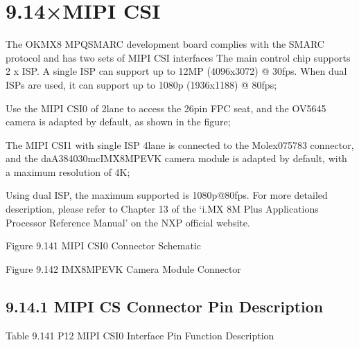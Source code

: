 \documentclass[letterpaper,10pt,openany,english]{sphinxmanual}
\begin{document}
\section{9.14×MIPI CSI}
\label{\detokenize{hardware:id29}}
\sphinxAtStartPar
The OK\sphinxhyphen{}MX8 MPQ\sphinxhyphen{}SMARC development board complies with the SMARC protocol and has two sets of MIPI CSI interfaces The main control chip supports 2 x ISP. A single ISP can support up to 12MP (4096x3072) @ 30fps. When dual ISPs are used, it can support up to 1080p (1936x1188) @ 80fps;

\sphinxAtStartPar
Use the MIPI CSI0 of 2\sphinxhyphen{}lane to access the 26pin FPC seat, and the OV5645 camera is adapted by default, as shown in the figure;

\sphinxAtStartPar
The MIPI CSI1 with single ISP 4\sphinxhyphen{}lane is connected to the Molex075783 connector, and the daA3840\sphinxhyphen{}30mc\sphinxhyphen{}IMX8MP\sphinxhyphen{}EVK camera module is adapted by default, with a maximum resolution of 4K;

\sphinxAtStartPar
Using dual ISP, the maximum supported is 1080p@80fps. For more detailed description, please refer to Chapter 13 of the ‘i.MX 8M Plus Applications Processor Reference Manual’ on the NXP official website.

\sphinxAtStartPar
{}

\sphinxAtStartPar
Figure 9.14\sphinxhyphen{}1 MIPI CSI0 Connector Schematic

\sphinxAtStartPar
{}

\sphinxAtStartPar
Figure 9.14\sphinxhyphen{}2 IMX8MP\sphinxhyphen{}EVK Camera Module Connector


\subsection{9.14.1 MIPI CS Connector Pin Description}
\label{\detokenize{hardware:mipi-cs-connector-pin-description}}
\sphinxAtStartPar
Table 9.14\sphinxhyphen{}1 P12 MIPI CSI0 Interface Pin Function Description
\end{document}
